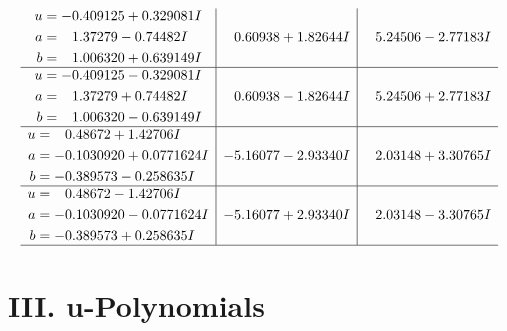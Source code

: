 \documentclass[1p]{elsarticle_modified}
\theoremstyle{definition}
\begin{document}
$$\begin{array}{c|c|c}
\begin{aligned}
u &= -0.409125 + 0.329081 I \\
a &= \phantom{-}1.37279 - 0.74482 I \\
b &= \phantom{-}1.006320 + 0.639149 I\end{aligned}
 & \phantom{-}0.60938 + 1.82644 I & \phantom{-}5.24506 - 2.77183 I \\ \hline\begin{aligned}
u &= -0.409125 - 0.329081 I \\
a &= \phantom{-}1.37279 + 0.74482 I \\
b &= \phantom{-}1.006320 - 0.639149 I\end{aligned}
 & \phantom{-}0.60938 - 1.82644 I & \phantom{-}5.24506 + 2.77183 I \\ \hline\begin{aligned}
u &= \phantom{-}0.48672 + 1.42706 I \\
a &= -0.1030920 + 0.0771624 I \\
b &= -0.389573 - 0.258635 I\end{aligned}
 & -5.16077 - 2.93340 I & \phantom{-}2.03148 + 3.30765 I \\ \hline\begin{aligned}
u &= \phantom{-}0.48672 - 1.42706 I \\
a &= -0.1030920 - 0.0771624 I \\
b &= -0.389573 + 0.258635 I\end{aligned}
 & -5.16077 + 2.93340 I & \phantom{-}2.03148 - 3.30765 I\\
 \hline 
 \end{array}$$\newpage
\newpage\renewcommand{\arraystretch}{1}
\centering \section*{ III. u-Polynomials}
\end{document}
